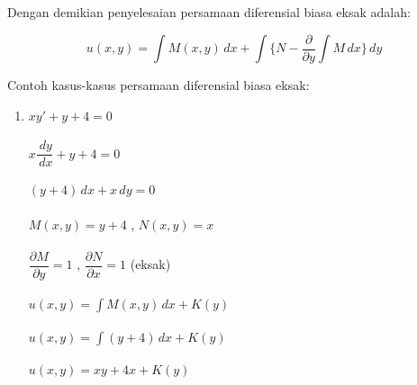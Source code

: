 Dengan demikian penyelesaian persamaan diferensial biasa eksak adalah:

\begin{equation} u(x, y) = \int M(x, y) \, dx + \int \bigg\{ N - \dfrac{\partial}{\partial y} \int M \, dx \bigg\} \, dy \end{equation}

Contoh kasus-kasus persamaan diferensial biasa eksak:

\begin{enumerate}[1.]

	\item \begin{math} xy' + y + 4 = 0 \end{math} \\ \\
		\begin{math} x \dfrac{\, dy}{\, dx} + y + 4 = 0\end{math} \\ \\
	       	\begin{math} (y + 4) \, dx + x \, dy = 0 \end{math} \\ \\
		\begin{math} M(x, y) = y + 4 \end{math} , \begin{math} N(x, y) = x \end{math} \\ \\
		\begin{math} \dfrac{\partial M}{\partial y} = 1 \end{math} , \begin{math} \dfrac{\partial N}{\partial x} = 1 \end{math} (eksak) \\ \\
		\begin{math} u(x, y) = \int M(x, y) \, dx + K(y) \end{math} \\ \\
		\begin{math} u(x, y) = \int (y + 4) \, dx + K(y) \end{math} \\ \\
		\begin{math} u(x, y) = xy + 4x + K(y) \end{math} \\ \\

\end{enumerate}
